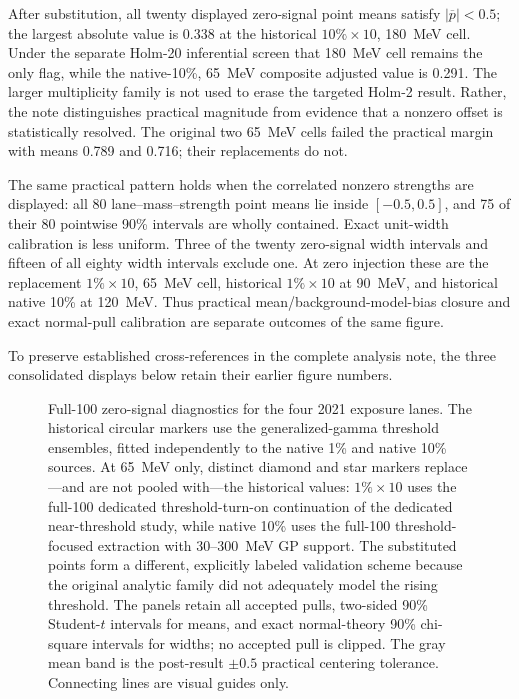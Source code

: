 After substitution, all twenty displayed zero-signal point means satisfy
$|\overline p|<0.5$; the largest absolute value is 0.338 at the historical
$10\%\times10$, 180~MeV cell.  Under the separate Holm-20 inferential screen that
180~MeV cell remains the only flag, while the native-10\%, 65~MeV composite adjusted
value is 0.291.  The larger multiplicity family is not used to erase the targeted
Holm-2 result.  Rather, the note distinguishes practical magnitude from evidence that
a nonzero offset is statistically resolved.  The original two 65~MeV cells failed the
practical margin with means 0.789 and 0.716; their replacements do not.

The same practical pattern holds when the correlated nonzero strengths are displayed:
all 80 lane--mass--strength point means lie inside $[-0.5,0.5]$, and 75 of their 80
pointwise 90\% intervals are wholly contained.  Exact unit-width calibration is less
uniform.  Three of the twenty zero-signal width intervals and fifteen of all eighty
width intervals exclude one.  At zero injection these are the replacement
$1\%\times10$, 65~MeV cell, historical $1\%\times10$ at 90~MeV, and historical
native 10\% at 120~MeV.  Thus practical mean/background-model-bias closure and exact
normal-pull calibration are separate outcomes of the same figure.

\ifwritingsample
\else
To preserve established cross-references in the complete analysis note, the three
consolidated displays below retain their earlier figure numbers.
\setcounter{figure}{63}
\fi
\begin{figure}[p]
\centering
{}
\caption{Full-100 zero-signal diagnostics for the four 2021 exposure lanes.  The
historical circular markers use the generalized-gamma threshold ensembles,
fitted independently to the native 1\% and native 10\% sources.
At 65~MeV only, distinct diamond and star markers replace---and are not pooled with---the
historical values: $1\%\times10$ uses the full-100 dedicated threshold-turn-on
continuation of the dedicated near-threshold study, while native 10\% uses the
full-100 threshold-focused extraction with 30--300~MeV GP support.  The substituted
points form a different, explicitly labeled validation scheme because the original
analytic family did not adequately model the rising threshold.  The panels retain
all accepted pulls, two-sided 90\% Student-$t$ intervals for means, and exact
normal-theory 90\% chi-square intervals for widths; no accepted pull is clipped.
The gray mean band is the post-result $\pm0.5$ practical centering tolerance.
Connecting lines are visual guides only.}
\label{fig:v491-zero-signal-full}
\end{figure}

